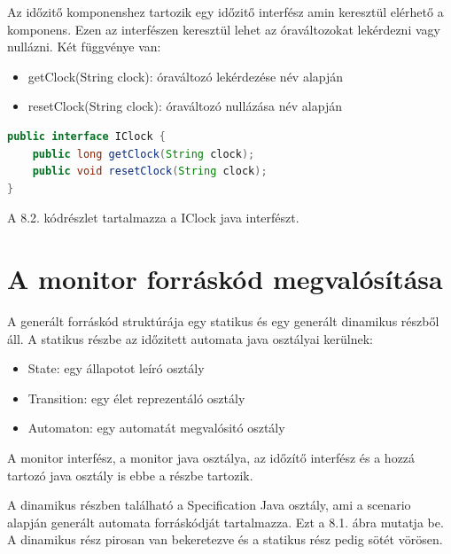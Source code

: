 Az időzitő komponenshez tartozik egy időzitő interfész amin keresztül elérhető a komponens.
Ezen az interfészen keresztül lehet az óraváltozokat lekérdezni vagy nullázni.
Két függvénye van:

\begin{itemize}
    \item getClock(String clock): óraváltozó lekérdezése név alapján
    \item resetClock(String clock): óraváltozó nullázása név alapján
\end{itemize}

\begin{lstlisting}[language=java,frame=single, float=h!, caption={Időzitő interfész Java implementációja.},captionpos=b]
public interface IClock {
	public long getClock(String clock);
	public void resetClock(String clock);
}
\end{lstlisting}

A 8.2. kódrészlet tartalmazza a IClock java interfészt.

\section{A monitor forráskód megvalósítása}
A generált forráskód struktúrája egy statikus és egy generált dinamikus részből áll.
A statikus részbe az időzitett automata java osztályai kerülnek:
\begin{itemize}
    \item State: egy állapotot leíró osztály
    \item Transition: egy élet reprezentáló osztály
    \item Automaton: egy automatát megvalósitó osztály
\end{itemize}

A monitor interfész, a monitor java osztálya, az időzítő interfész és a hozzá tartozó java osztály is ebbe a részbe tartozik.

A dinamikus részben található a Specification Java osztály, ami a scenario alapján generált automata forráskódját tartalmazza.
Ezt a 8.1. ábra mutatja be.
A dinamikus rész pirosan van bekeretezve és a statikus rész pedig sötét vörösen.

